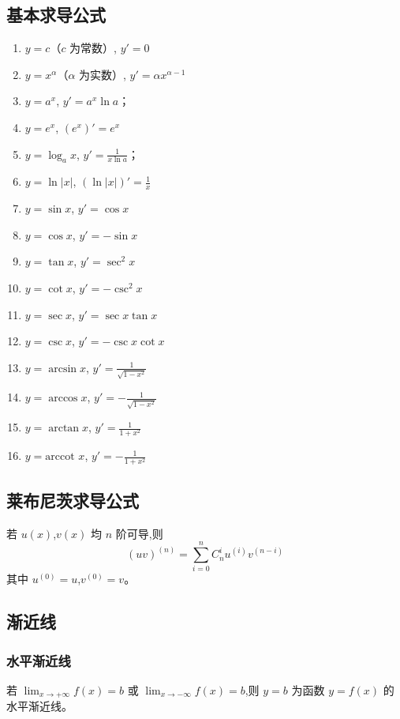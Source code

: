 \documentclass[UTF8]{ctexart}
\theoremstyle{remark}
\begin{document}
	\subsection{基本求导公式}
	\begin{enumerate}
		\item  \(y = c\)（\(c\) 为常数）, \(y' = 0\)
		\item  \(y = x^{\alpha}\)（\(\alpha\) 为实数）, \(y' = \alpha x^{\alpha - 1}\)
		\item  \(y = a^x\), \(y' = a^x \ln a\)； 
		\item  \(y = e^x\), \((e^x)' = e^x\)
		\item  \(y = \log_{a}x\), \(y' = \frac{1}{x \ln a}\)； 
		\item  \(y = \ln|x|\), \((\ln|x|)' = \frac{1}{x}\)
		\item  \(y = \sin x\), \(y' = \cos x\)
		\item  \(y = \cos x\), \(y' = -\sin x\)
		\item  \(y = \tan x\), \(y' = \sec^{2}x\)
		\item  \(y = \cot x\), \(y' = -\csc^{2}x\)
		\item  \(y = \sec x\), \(y' = \sec x \tan x\)
		\item  \(y = \csc x\), \(y' = -\csc x \cot x\)
		\item  \(y = \arcsin x\), \(y' = \frac{1}{\sqrt{1 - x^{2}}}\)
		\item  \(y = \arccos x\), \(y' = -\frac{1}{\sqrt{1 - x^{2}}}\)
		\item  \(y = \arctan x\), \(y' = \frac{1}{1 + x^{2}}\)
		\item  \(y = \text{arccot }x\), \(y' = -\frac{1}{1 + x^{2}}\)
	\end{enumerate}
	
	\subsection{莱布尼茨求导公式}
	若 \(u(x)\),\(v(x)\) 均 \(n\) 阶可导,则
	\[
	(uv)^{(n)} = \sum_{i = 0}^{n} C_{n}^{i} u^{(i)} v^{(n - i)}
	\]
	其中 \(u^{(0)} = u\),\(v^{(0)} = v\)。
	
	\subsection{渐近线}
	\subsubsection{水平渐近线}
	若 \(\lim_{x \to +\infty} f(x) = b\) 或 \(\lim_{x \to -\infty} f(x) = b\),则 \(y = b\) 为函数 \(y = f(x)\) 的水平渐近线。
	
\end{document}
